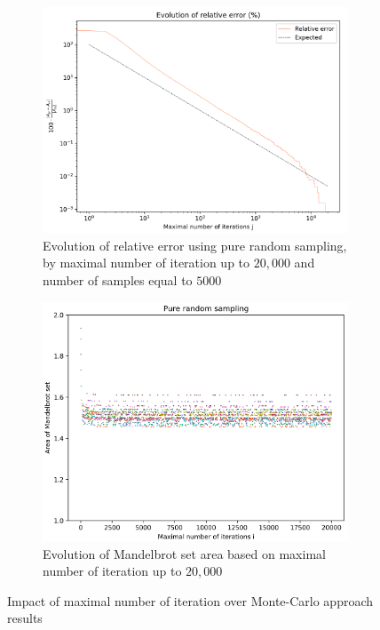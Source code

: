 \documentclass{article}
\begin{document}
    \begin{figure}[h]
        \centering
        \begin{subfigure}[t]{.48\linewidth}
            \includegraphics[width=\textwidth]{pictures/part_2/maximal_number_iteration_convergence.png}
            \caption{Evolution of relative error using pure random sampling, by maximal number of iteration up to $20,000$ and number of samples equal to $5000$ }
            \label{fig:maximal_iteration_relative_error}
        \end{subfigure}
        \begin{subfigure}[t]{.48\linewidth}
            \centering
            \includegraphics[width=\textwidth]{pictures/part_2/maximal_number_iteration_area_50_simulations.png}
            \caption{Evolution of Mandelbrot set area based on maximal number of iteration up to $20,000$}
            \label{fig:maximal_iteration_area_evolution}
        \end{subfigure}

        \caption{Impact of maximal number of iteration over Monte-Carlo approach results}
        \label{fig:maximal_iteration}
    \end{figure}
\end{document}
